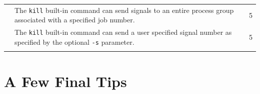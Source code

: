 \documentclass[10pt]{article}
\newcommand{\checkbox}[0]{\makebox[0pt][l]{$\square$}\raisebox{.15ex}{\hspace{0.1em}}}
\begin{document}
\begin{longtable}[c]{@{}lll@{}}
\begin{minipage}[t]{0.06\columnwidth}
\end{minipage} \checkbox & \begin{minipage}[t]{0.74\columnwidth}\raggedright
The \texttt{kill} built-in command can send signals to an entire process
group associated with a specified job number.
\end{minipage} & \begin{minipage}[t]{0.11\columnwidth}\raggedright
5
\end{minipage}
\\\addlinespace\hline\addlinespace
\begin{minipage}[t]{0.06\columnwidth}\raggedright
\end{minipage} \checkbox & \begin{minipage}[t]{0.74\columnwidth}\raggedright
The \texttt{kill} built-in command can send a user specified signal
number as specified by the optional \texttt{-s} parameter.
\end{minipage} & \begin{minipage}[t]{0.11\columnwidth}\raggedright
5
\end{minipage}
\\\addlinespace
\bottomrule
\end{longtable}


\pagebreak

\section{A Few Final Tips}
\end{document}
